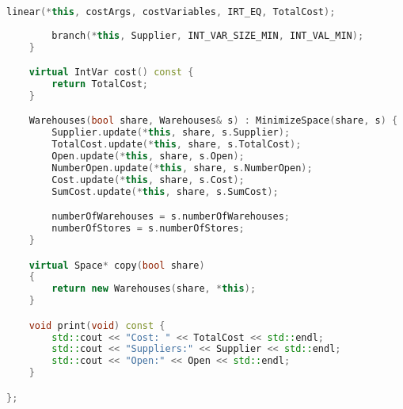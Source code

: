 \begin{lstlisting}[language=C++]
		linear(*this, costArgs, costVariables, IRT_EQ, TotalCost);
		
		branch(*this, Supplier, INT_VAR_SIZE_MIN, INT_VAL_MIN);
	}

	virtual IntVar cost() const {
		return TotalCost;
	}

	Warehouses(bool share, Warehouses& s) : MinimizeSpace(share, s) {
		Supplier.update(*this, share, s.Supplier);
		TotalCost.update(*this, share, s.TotalCost);
		Open.update(*this, share, s.Open);
		NumberOpen.update(*this, share, s.NumberOpen);
		Cost.update(*this, share, s.Cost);
		SumCost.update(*this, share, s.SumCost);

		numberOfWarehouses = s.numberOfWarehouses;
		numberOfStores = s.numberOfStores;
	}

	virtual Space* copy(bool share)
	{
		return new Warehouses(share, *this);
	}

	void print(void) const {
		std::cout << "Cost: " << TotalCost << std::endl;
		std::cout << "Suppliers:" << Supplier << std::endl;
		std::cout << "Open:" << Open << std::endl;
	}

};
\end{lstlisting}